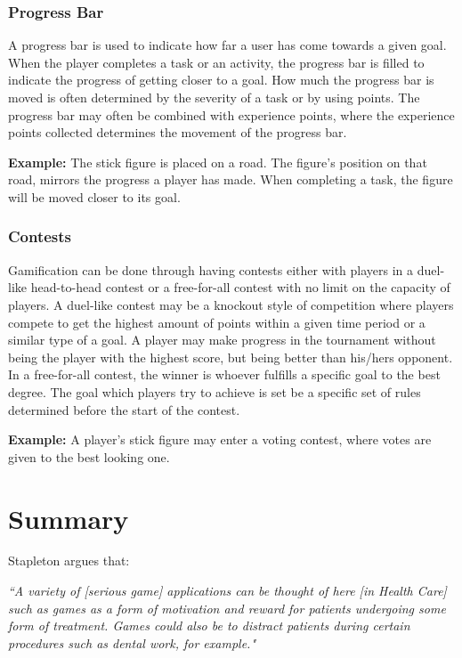 \subsubsection{Progress Bar}
\label{sec:progressbar}
A progress bar is used to indicate how far a user has come towards a given goal. When the player completes a task or an activity, the progress bar is filled to indicate the progress of getting closer to a goal. How much the progress bar is moved is often determined by the severity of a task or by using points. The progress bar may often be combined with experience points, where the experience points collected determines the movement of the progress bar. 

\textbf{Example:} The stick figure is placed on a road. The figure's position on that road, mirrors the progress a player has made. When completing a task, the figure will be moved closer to its goal.  


\subsubsection{Contests}
\label{sec:contests}
Gamification can be done through having contests either with players in a duel-like head-to-head contest or a free-for-all contest with no limit on the capacity of players. A duel-like contest may be a knockout style of competition where players compete to get the highest amount of points within a given time period or a similar type of a goal. A player may make progress in the tournament without being the player with the highest score, but being better than his/hers opponent. In a free-for-all contest, the winner is whoever fulfills a specific goal to the best degree. The goal which players try to achieve is set be a specific set of rules determined before the start of the contest.

\textbf{Example:} A player's stick figure may enter a voting contest, where votes are given to the best looking one.

\section{Summary}
\label{sec:gamificationinapp}

Stapleton argues that:

\textit{``A variety of [serious game] applications can be thought of here [in Health Care] such as games as a form of motivation and reward for patients undergoing some form of treatment. Games could also be to distract patients during certain procedures such as dental work, for example."}\cite{stapleton2004serious}


